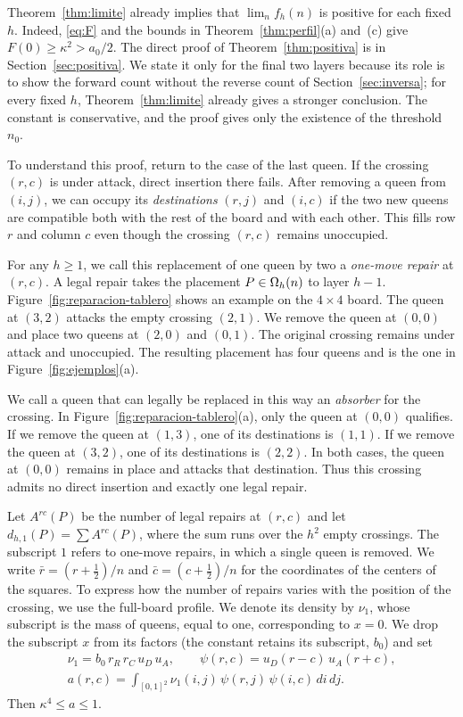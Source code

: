 Theorem~\ref{thm:limite} already implies that $\lim_nf_h(n)$ is positive for each fixed $h$. Indeed,
\eqref{eq:F} and the bounds in
Theorem~\ref{thm:perfil}(a) and~(c) give $F(0)\ge\kappa^2>a_0/2$. The direct proof of
Theorem~\ref{thm:positiva} is in
Section~\ref{sec:positiva}. We state it only for the final two layers because its role is to show the
forward count without the
reverse count of Section~\ref{sec:inversa}; for every fixed $h$, Theorem~\ref{thm:limite} already gives a
stronger conclusion. The
constant is conservative, and the proof gives only the existence of the threshold $n_0$.

To understand this proof, return to the case of the last queen. If the crossing $(r,c)$ is under attack,
direct insertion there fails.
After removing a queen from $(i,j)$, we can occupy its \emph{destinations} $(r,j)$ and $(i,c)$ if the two
new queens are compatible both
with the rest of the board and with each other. This fills row $r$ and column $c$ even though the crossing
$(r,c)$ remains unoccupied.

For any $h\ge1$, we call this replacement of one queen by two a \emph{one-move repair} at $(r,c)$. A legal
repair takes the placement
$P\in\Omega_h(n)$ to layer $h-1$. Figure~\ref{fig:reparacion-tablero} shows an example on the $4\times4$ board.
The queen at $(3,2)$ attacks the
empty crossing $(2,1)$. We remove the queen at $(0,0)$ and place two queens at $(2,0)$ and $(0,1)$. The
original crossing remains under
attack and unoccupied. The resulting placement has four queens and is the one in
Figure~\ref{fig:ejemplos}(a).



We call a queen that can legally be replaced in this way an \emph{absorber} for the crossing. In
Figure~\ref{fig:reparacion-tablero}(a), only the queen at $(0,0)$ qualifies. If we remove the queen at
$(1,3)$, one of its destinations is
$(1,1)$. If we remove the queen at $(3,2)$, one of its destinations is $(2,2)$. In both cases, the queen at
$(0,0)$ remains in place and
attacks that destination. Thus this crossing admits no direct insertion and exactly one legal repair.

Let $A^{rc}(P)$ be the number of legal repairs at $(r,c)$ and let $d_{h,1}(P)=\sum A^{rc}(P)$, where the sum
runs over the $h^2$ empty
crossings. The subscript $1$ refers to one-move repairs, in which a single queen is removed. We write
$\bar r=(r+\frac12)/n$ and $\bar
c=(c+\frac12)/n$ for the coordinates of the centers of the squares. To express how the number of repairs
varies with the position of the
crossing, we use the full-board profile. We denote its density by $\nu_1$, whose subscript is the mass of
queens, equal to one,
corresponding to $x=0$. We drop the subscript $x$ from its factors (the constant retains its subscript,
$b_0$) and set \begin{gather*}
 \nu_1=b_0\,r_R\,r_C\,u_D\,u_A,\qquad \psi(r,c)=u_D(r-c)\,u_A(r+c),\\
 a(r,c)=\int_{[0,1]^2}\nu_1(i,j)\,\psi(r,j)\,\psi(i,c)\,di\,dj .
\end{gather*} Then $\kappa^4\le a\le1$.

